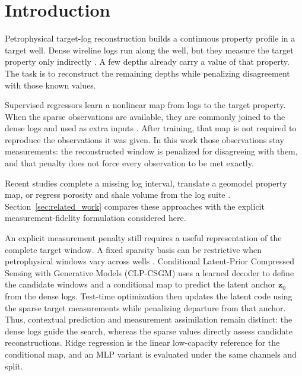 \section{Introduction}
\label{sec:introduction}

Petrophysical target-log reconstruction builds a continuous property profile
in a target well. Dense wireline logs run along the well, but they measure
the target property only indirectly
\citep{ellis2007well,asquith2004basic,wang2024loggingreview,mondal2022corelog,sun2026corecalibrated}.
A few depths already carry a value of that property. The task is to
reconstruct the remaining depths while penalizing disagreement with those
known values.

Supervised regressors learn a nonlinear map from logs to the target property.
When the sparse observations are available, they are commonly joined to the
dense logs and used as extra inputs
\citep{bishop2006pattern,ahmadi2019comparison,wood2020predicting,pan2023multiwell,mondal2022corelog,koray2024integrated,matinkia2023permpred,abdelazim2022permlogs,shi2024gnsperm,he2025porosity,markus2026hybrid}.
After training, that map is not required to reproduce the observations it was
given. In this work those observations stay measurements: the reconstructed
window is penalized for disagreeing with them, and that penalty does not
force every observation to be met exactly.

Recent studies complete a missing log interval, translate a geomodel property
map, or regress porosity and shale volume from the log suite
\citep{koeshidayatullah2026timegpt,alfakih2026pix2geomodel,alfakih2025wellloggan,alfakih2023northsea}.
Section~\ref{sec:related_work} compares these approaches with the explicit
measurement-fidelity formulation considered here.

An explicit measurement penalty still requires a useful representation of
the complete target window. A fixed sparsity basis can be restrictive when
petrophysical windows vary across wells
\citep{donoho2006compressed,candes2006robust,candes2006stable,bora2017compressed}.
Conditional Latent-Prior Compressed Sensing with Generative Models
(CLP-CSGM) uses a learned decoder to define the candidate windows and a
conditional map to predict the latent anchor
$\boldsymbol{z}_0$ from the dense logs. Test-time optimization then updates
the latent code using the sparse target measurements while penalizing
departure from that anchor. Thus, contextual prediction and measurement
assimilation remain distinct: the dense logs guide the search, whereas the
sparse values directly assess candidate reconstructions. Ridge regression is
the linear low-capacity reference for the conditional map, and an MLP variant
is evaluated under the same channels and split.

